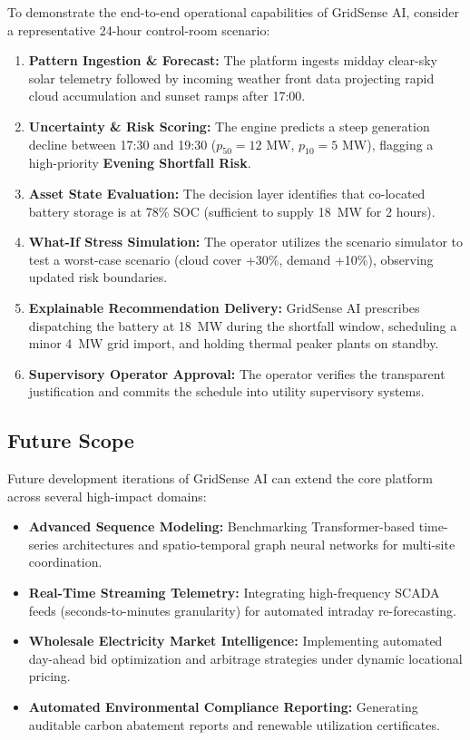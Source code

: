 To demonstrate the end-to-end operational capabilities of GridSense AI, consider a representative 24-hour control-room scenario:
\begin{enumerate}[leftmargin=1.8em, itemsep=0.25em]
    \item \textbf{Pattern Ingestion \& Forecast:} The platform ingests midday clear-sky solar telemetry followed by incoming weather front data projecting rapid cloud accumulation and sunset ramps after 17:00.
    \item \textbf{Uncertainty \& Risk Scoring:} The engine predicts a steep generation decline between 17:30 and 19:30 ($p_{50} = 12\text{ MW}$, $p_{10} = 5\text{ MW}$), flagging a high-priority \textbf{Evening Shortfall Risk}.
    \item \textbf{Asset State Evaluation:} The decision layer identifies that co-located battery storage is at 78\% SOC (sufficient to supply 18~MW for 2 hours).
    \item \textbf{What-If Stress Simulation:} The operator utilizes the scenario simulator to test a worst-case scenario (cloud cover +30\%, demand +10\%), observing updated risk boundaries.
    \item \textbf{Explainable Recommendation Delivery:} GridSense AI prescribes dispatching the battery at 18~MW during the shortfall window, scheduling a minor 4~MW grid import, and holding thermal peaker plants on standby.
    \item \textbf{Supervisory Operator Approval:} The operator verifies the transparent justification and commits the schedule into utility supervisory systems.
\end{enumerate}

\subsection{Future Scope}
\label{subsec:future_scope}

Future development iterations of GridSense AI can extend the core platform across several high-impact domains:
\begin{itemize}[leftmargin=1.8em, itemsep=0.2em]
    \item \textbf{Advanced Sequence Modeling:} Benchmarking Transformer-based time-series architectures and spatio-temporal graph neural networks for multi-site coordination.
    \item \textbf{Real-Time Streaming Telemetry:} Integrating high-frequency SCADA feeds (seconds-to-minutes granularity) for automated intraday re-forecasting.
    \item \textbf{Wholesale Electricity Market Intelligence:} Implementing automated day-ahead bid optimization and arbitrage strategies under dynamic locational pricing.
    \item \textbf{Automated Environmental Compliance Reporting:} Generating auditable carbon abatement reports and renewable utilization certificates.
\end{itemize}

